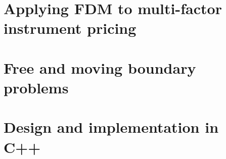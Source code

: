 \documentclass[
	a4paper,
	10pt,
	oneside
]{scrbook}
\begin{document}
\part{Applying FDM to multi-factor instrument pricing}

\begingroup
\let\clearpage\relax




\endgroup

\part{Free and moving boundary problems}

\begingroup
\let\clearpage\relax




\endgroup

\part{Design and implementation in C++}

\begingroup
\let\clearpage\relax




\endgroup

\backmatter
\end{document}
